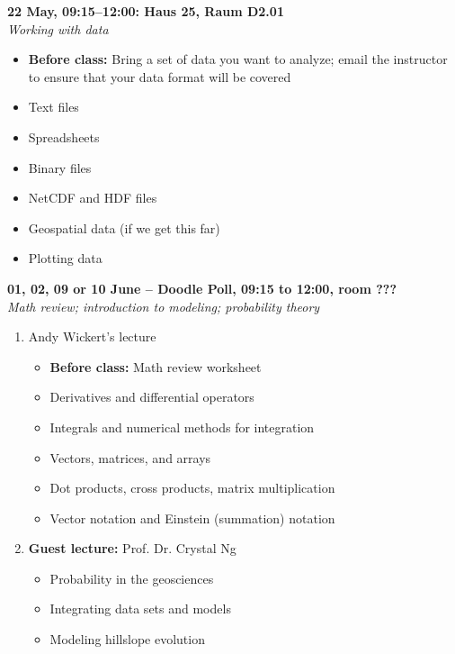 \documentclass[10pt,a4paper]{amsart}
\begin{document}
\begin{minipage}{\linewidth}
\noindent \textbf{22 May, 09:15--12:00: Haus 25, Raum D2.01}\\
\textit{Working with data}
\begin{itemize}
 \item \textbf{Before class:} Bring a set of data you want to analyze; email the instructor to ensure that your data format will be covered
 \item Text files
 \item Spreadsheets
 \item Binary files
 \item NetCDF and HDF files
 \item Geospatial data (if we get this far)
 \item Plotting data
\end{itemize}
\vspace{12pt}
\end{minipage}

\begin{minipage}{\linewidth}
\noindent \textbf{01, 02, 09 or 10 June -- Doodle Poll, 09:15 to 12:00, room ???}\\
\textit{Math review; introduction to modeling; probability theory}
\begin{enumerate}
\item Andy Wickert's lecture
\begin{itemize}
 \item \textbf{Before class:} Math review worksheet
 \item Derivatives and differential operators
 \item Integrals and numerical methods for integration
 \item Vectors, matrices, and arrays
 \item Dot products, cross products, matrix multiplication
 \item Vector notation and Einstein (summation) notation
\end{itemize}
\item \textbf{Guest lecture:} Prof. Dr. Crystal Ng
\begin{itemize}
 \item Probability in the geosciences
 \item Integrating data sets and models
 \item Modeling hillslope evolution
\end{itemize}
\end{enumerate}
\vspace{12pt}
\end{minipage}
\end{document}
